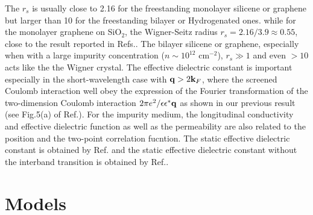 \documentclass[UTF8,a4paper]{article}
\begin{document}
\begin{large}
The $r_{s}$ is usually close to 2.16 for the freestanding monolayer silicene or graphene
but larger than 10 for the freestanding bilayer\cite{Sensarma R} or Hydrogenated ones\cite{Guillemette J}.
while for the monolayer graphene on SiO$_{2}$, the Wigner-Seitz radius $r_{s}=2.16/3.9\approx 0.55$,
close to the result reported in Refs.\cite{Hwang E H,Malcolm J D}.
The bilayer silicene or graphene, especially when with a large impurity concentration ($n\sim 10^{12}$ cm$^{-2}$),
$r_{s}\gg 1$ and even $>10$ acts like the the Wigner crystal.
The effective dielectric constant is important especially in the short-wavelength case with ${\bf q}>2{\bf k}_{F}$,
where the screened Coulomb interaction well obey the expression of the Fourier transformation of the two-dimension Coulomb interaction 
$2\pi e^{2}/\epsilon\epsilon^{*}{\bf q}$ as shown in our previous result (see Fig.5(a) of Ref.\cite{Wu C H_3}).
For the impurity medium, the longitudinal conductivity and effective dielectric function as well as the permeability are
also related to the position and the two-point correlation fucntion.
The static effective dielectric constant is obtained by Ref.\cite{Sodemann I}
and the static effective dielectric constant without the interband transition is obtained by Ref.\cite{Keller J B}.

\section{Models}


\end{large}
\end{document}
